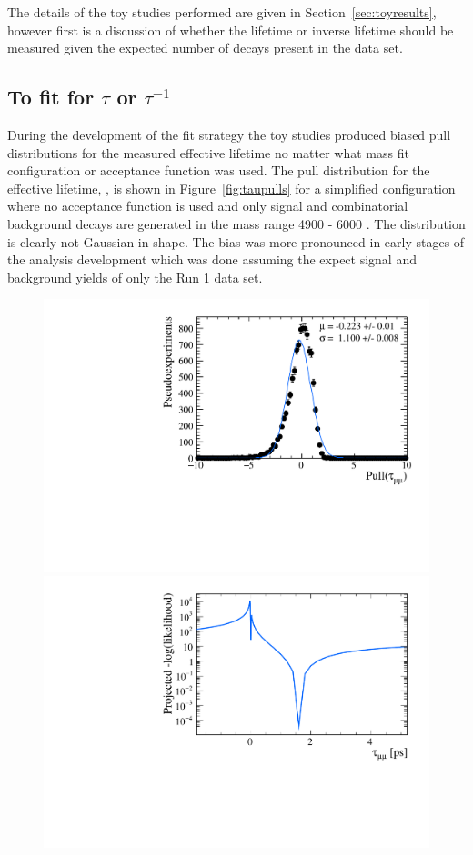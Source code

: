 { The details of the toy studies performed are given in Section~\ref{sec:toyresults}, however first is a discussion of whether the \bsmumu lifetime or inverse lifetime should be measured given the expected number of decays present in the data set.  

\subsection{To fit for $\tau$ or $\tau^{-1}$}
\label{sec:tauORinvtau}
During the development of the fit strategy the toy studies produced biased pull distributions for the measured \bsmumu effective lifetime no matter what mass fit configuration or acceptance function was used. The pull distribution for the effective lifetime, \tmumu, is shown in Figure~\ref{fig:taupulls} for a simplified configuration where no acceptance function is used and only signal and combinatorial background decays are generated in the mass range 4900 - 6000 \mevcc. The distribution is clearly not Gaussian in shape. The bias was more pronounced in early stages of the analysis development which was done assuming the expect signal and background yields of only the Run 1 data set.%

\begin{figure}[htbp]
    \centering
        \includegraphics[width= 0.49 \textwidth]{./Figs/LifetimeMeasurement/CKM_simple_tau_pull.pdf} 
        \includegraphics[width= 0.49 \textwidth]{./Figs/LifetimeMeasurement/tau_LL.pdf}  

 

\end{figure}}
